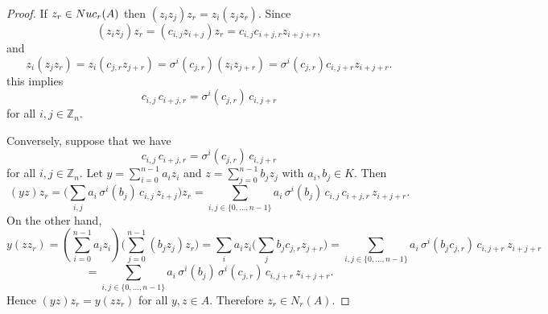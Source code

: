 \documentclass[10pt,a4paper]{amsart}
\begin{document}
\begin{proof}
If
$z_r\in {\rm Nuc}_r(A)$ then $(z_i z_j)z_r=z_i(z_j z_r)$. Since
\[
(z_i z_j) z_r
= (c_{i,j} z_{i+j}) z_r
= c_{i,j} c_{i+j,r} z_{i+j+r},
\]
and
\[
z_i (z_j z_r)
= z_i (c_{j,r} z_{j+r})
= \sigma^i(c_{j,r}) ( z_i z_{j+r})
= \sigma^i(c_{j,r}) c_{i,j+r}  z_{i+j+r}.
\]
this implies
\[
c_{i,j}\,c_{i+j,r} = \sigma^{i}(c_{j,r})\,c_{i,j+r}
\]
for all $ i,j\in \mathbb{Z}_n$.



Conversely, suppose that we have
\[
c_{i,j}\,c_{i+j,r} = \sigma^{i}(c_{j,r})\,c_{i,j+r}
\]
 for all $i,j\in \mathbb{Z}_n$.  Let $y=\sum_{i=0}^{n-1} a_i z_i$ and $z=\sum_{j=0}^{n-1} b_j z_j$ with $a_i,b_j\in K$.
Then
\[
(y z) z_r
 = \Big(\sum_{i,j} a_i\,\sigma^i(b_j)\,c_{i,j}\,z_{i+j}\Big) z_r
 = \sum_{i,j\in\{0,\dots, n-1\}} a_i\,\sigma^i(b_j)\,c_{i,j}\,c_{i+j,r}\, z_{i+j+r}.
\]
On the other hand,
\[
y (z z_r)
=(\sum_{i=0}^{n-1} a_i z_i) \Big(\sum_{j=0}^{n-1} (b_j z_j)z_r\Big)
 = \sum_i a_i z_i \Big(\sum_j b_j c_{j,r} z_{j+r}\Big)
 = \sum_{i,j\in\{0,\dots, n-1\}} a_i\,\sigma^i(b_j c_{j,r})\,c_{i,j+r}\, z_{i+j+r}
\]
$$ = \sum_{i,j\in\{0,\dots, n-1\} } a_i\,\sigma^i(b_j)\,\sigma^i(c_{j,r})\,c_{i,j+r}\, z_{i+j+r}.$$
Hence $(y z) z_r = y (z z_r)$ for all $y,z\in A$.  Therefore $z_r\in N_r(A)$.
\end{proof}
\end{document}
